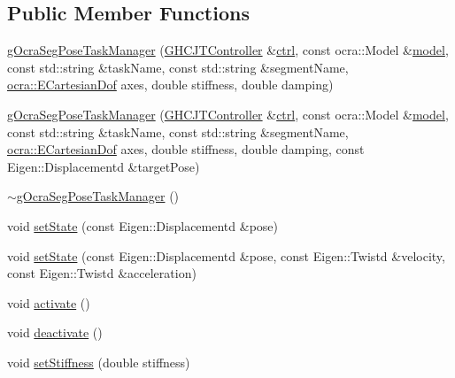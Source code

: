 \subsection*{Public Member Functions}
\begin{DoxyCompactItemize}
\item 
\hyperlink{classgocra_1_1gOcraSegPoseTaskManager_a9756a704f7ac1b45084ed1aa44ffc805}{g\+Ocra\+Seg\+Pose\+Task\+Manager} (\hyperlink{classgocra_1_1GHCJTController}{G\+H\+C\+J\+T\+Controller} \&\hyperlink{classgocra_1_1gOcraTaskManagerBase_a52d76d9b54d92f3d31faeaafda99e4c7}{ctrl}, const ocra\+::\+Model \&\hyperlink{classgocra_1_1gOcraTaskManagerBase_adc439e7170f7120611fc6d009d06404e}{model}, const std\+::string \&task\+Name, const std\+::string \&segment\+Name, \hyperlink{namespaceocra_a436781c7059a0f76027df1c652126260}{ocra\+::\+E\+Cartesian\+Dof} axes, double stiffness, double damping)
\item 
\hyperlink{classgocra_1_1gOcraSegPoseTaskManager_a5bf1af63ef4741f8ac30ce2a042dc9b2}{g\+Ocra\+Seg\+Pose\+Task\+Manager} (\hyperlink{classgocra_1_1GHCJTController}{G\+H\+C\+J\+T\+Controller} \&\hyperlink{classgocra_1_1gOcraTaskManagerBase_a52d76d9b54d92f3d31faeaafda99e4c7}{ctrl}, const ocra\+::\+Model \&\hyperlink{classgocra_1_1gOcraTaskManagerBase_adc439e7170f7120611fc6d009d06404e}{model}, const std\+::string \&task\+Name, const std\+::string \&segment\+Name, \hyperlink{namespaceocra_a436781c7059a0f76027df1c652126260}{ocra\+::\+E\+Cartesian\+Dof} axes, double stiffness, double damping, const Eigen\+::\+Displacementd \&target\+Pose)
\item 
\hyperlink{classgocra_1_1gOcraSegPoseTaskManager_a0873a055633adab861365426676d3fe3}{$\sim$g\+Ocra\+Seg\+Pose\+Task\+Manager} ()
\item 
void \hyperlink{classgocra_1_1gOcraSegPoseTaskManager_a555cdc369d151ba153bcd681461cde24}{set\+State} (const Eigen\+::\+Displacementd \&pose)
\item 
void \hyperlink{classgocra_1_1gOcraSegPoseTaskManager_a1e1f6ca0ab0e5d174e4810f8123664c3}{set\+State} (const Eigen\+::\+Displacementd \&pose, const Eigen\+::\+Twistd \&velocity, const Eigen\+::\+Twistd \&acceleration)
\item 
void \hyperlink{classgocra_1_1gOcraSegPoseTaskManager_a0fdbbb5fc40c89253fa9d9c83e8aaecc}{activate} ()
\item 
void \hyperlink{classgocra_1_1gOcraSegPoseTaskManager_ab544efb740604150c99b020a5e1f04de}{deactivate} ()
\item 
void \hyperlink{classgocra_1_1gOcraSegPoseTaskManager_aee63dd2df0da89a98c844245abd87297}{set\+Stiffness} (double stiffness)

\end{DoxyCompactItemize}
